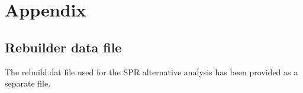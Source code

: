 \documentclass[11pt,
  english,
  a4paper,
]{article}
\begin{document}
\tagmcend\tagstructend

\clearpage


\hypertarget{appendix}{%
\section{Appendix}\label{appendix}}

\leavevmode\tagmcend\tagstructend


\hypertarget{rebuilder-data-file}{%
\subsection{Rebuilder data file}\label{rebuilder-data-file}}

\leavevmode\tagmcend\tagstructend


The rebuild.dat file used for the SPR alternative analysis has been provided as a separate file.

\leavevmode\tagmcend\tagstructend\par
\end{document}
